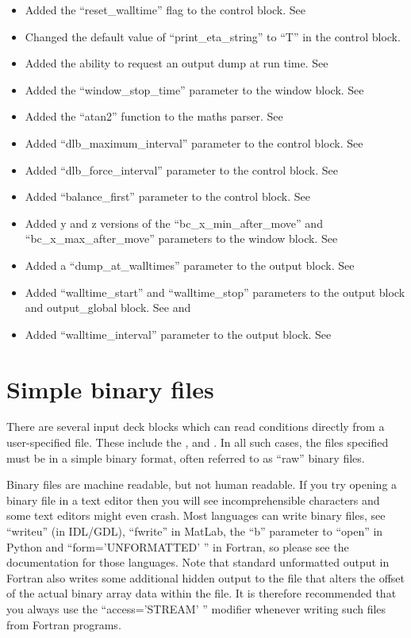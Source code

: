 \begin{itemize}
\item Added the ``reset\_walltime'' flag to the control block.
    See 
\item Changed the default value of ``print\_eta\_string'' to ``T'' in the
    control block.
\item Added the ability to request an output dump at run time.
    See 
\item Added the ``window\_stop\_time'' parameter to the window block.
    See 
\item Added the ``atan2'' function to the maths parser.
    See 
\item Added ``dlb\_maximum\_interval'' parameter to the control block.
    See 
\item Added ``dlb\_force\_interval'' parameter to the control block.
    See 
\item Added ``balance\_first'' parameter to the control block.
    See 
\item Added y and z versions of the ``bc\_x\_min\_after\_move'' and
    ``bc\_x\_max\_after\_move'' parameters to the window block.
    See 
\item Added a ``dump\_at\_walltimes'' parameter to the output block.
    See 
\item Added ``walltime\_start'' and ``walltime\_stop'' parameters to the output
    block and output\_global block.
    See  and 
\item Added ``walltime\_interval'' parameter to the output block.
    See 
\end{itemize}
\bigskip


\section{Simple binary files}
\label{sec:binaryfile}
There are several input deck blocks which can read conditions directly from
a user-specified file. These include the ,
 and . In all such cases,
the files specified must be in a simple binary format, often referred to
as ``raw'' binary files.

Binary files are machine readable, but not human readable. If you try opening
a binary file in a text editor then you will see incomprehensible characters
and some text editors might even crash. Most languages can write binary files,
see ``writeu'' (in IDL/GDL), ``fwrite'' in MatLab, the ``b'' parameter to
``open'' in Python and ``form='UNFORMATTED' '' in Fortran, so please see the
documentation for those languages. Note that standard unformatted output in
Fortran also writes some additional hidden output to the file that alters the
offset of the actual binary array data within the file. It is therefore
recommended that you always use the ``access='STREAM' '' modifier whenever
writing such files from Fortran programs.

